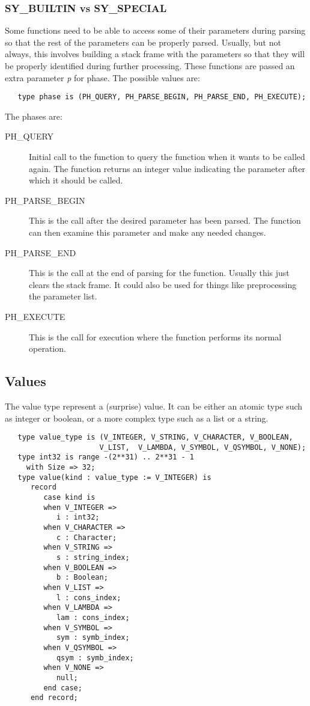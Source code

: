 \documentclass[10pt, openany]{book}
\begin{document}
\subsubsection{SY\_BUILTIN vs SY\_SPECIAL}
Some functions need to be able to access some of their parameters during parsing so that the rest of the parameters can be properly parsed.  Usually, but not always, this involves building a stack frame with the parameters so that they will be properly identified during further processing.  These functions are passed an extra parameter \emph{p} for phase.  The possible values are:
\begin{lstlisting}
   type phase is (PH_QUERY, PH_PARSE_BEGIN, PH_PARSE_END, PH_EXECUTE);
\end{lstlisting}

The phases are:
\begin{description}
  \item[PH\_QUERY] Initial call to the function to query the function when it wants to be called again.  The function returns an integer value indicating the parameter after which it should be called.
  \item[PH\_PARSE\_BEGIN] This is the call after the desired parameter has been parsed.  The function can then examine this parameter and make any needed changes.
  \item[PH\_PARSE\_END] This is the call at the end of parsing for the function.  Usually this just clears the stack frame.  It could also be used for things like preprocessing the parameter list.
  \item[PH\_EXECUTE] This is the call for execution where the function performs its normal operation.
\end{description}

\subsection{Values}
\label{sec:Values}
The value type represent a (surprise) value.  It can be either an atomic type such as integer or boolean, or a more complex type such as a list or a string.  
\begin{lstlisting}
   type value_type is (V_INTEGER, V_STRING, V_CHARACTER, V_BOOLEAN,
                      V_LIST,  V_LAMBDA, V_SYMBOL, V_QSYMBOL, V_NONE);
   type int32 is range -(2**31) .. 2**31 - 1
     with Size => 32;
   type value(kind : value_type := V_INTEGER) is
      record
         case kind is
         when V_INTEGER =>
            i : int32;
         when V_CHARACTER =>
            c : Character;
         when V_STRING =>
            s : string_index;
         when V_BOOLEAN =>
            b : Boolean;
         when V_LIST =>
            l : cons_index;
         when V_LAMBDA =>
            lam : cons_index;
         when V_SYMBOL =>
            sym : symb_index;
         when V_QSYMBOL =>
            qsym : symb_index;
         when V_NONE =>
            null;
         end case;
      end record;
\end{lstlisting}
\end{document}
